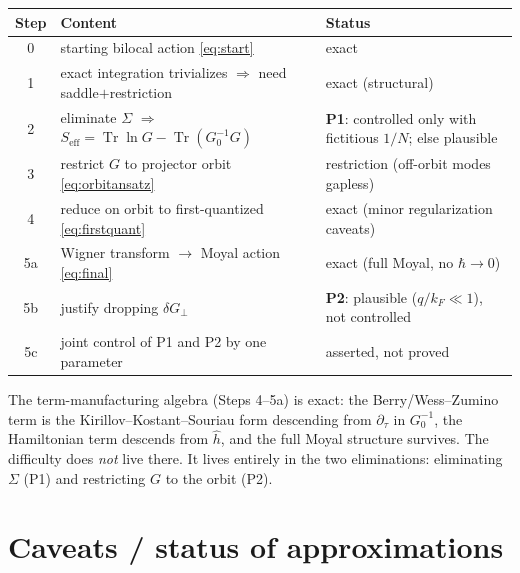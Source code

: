 \documentclass[11pt]{article}
\theoremstyle{remark}
\begin{document}
\begin{center}
\renewcommand{\arraystretch}{1.25}
\begin{tabular}{c l l}
\hline
Step & Content & Status\\
\hline
0 & starting bilocal action \eqref{eq:start} & exact\\
1 & exact integration trivializes $\Rightarrow$ need saddle$+$restriction & exact (structural)\\
2 & eliminate $\Sigma$ $\Rightarrow$ $S_{\mathrm{eff}}=\operatorname{Tr}\ln G-\operatorname{Tr}(G_0^{-1}G)$ & \textbf{P1}: controlled only with fictitious $1/N$; else plausible\\
3 & restrict $G$ to projector orbit \eqref{eq:orbitansatz} & restriction (off-orbit modes gapless)\\
4 & reduce on orbit to first-quantized \eqref{eq:firstquant} & exact (minor regularization caveats)\\
5a & Wigner transform $\to$ Moyal action \eqref{eq:final} & exact (full Moyal, no $\hbar\to0$)\\
5b & justify dropping $\delta G_\perp$ & \textbf{P2}: plausible ($q/k_F\ll1$), not controlled\\
5c & joint control of P1 and P2 by one parameter & asserted, not proved\\
\hline
\end{tabular}
\end{center}

\noindent The term-manufacturing algebra (Steps 4--5a) is exact: the Berry/Wess--Zumino
term is the Kirillov--Kostant--Souriau form descending from $\partial_\tau$ in $G_0^{-1}$,
the Hamiltonian term descends from $\hat h$, and the full Moyal structure survives. The
difficulty does \emph{not} live there. It lives entirely in the two eliminations:
eliminating $\Sigma$ (P1) and restricting $G$ to the orbit (P2).

\section{Caveats / status of approximations}
\end{document}
